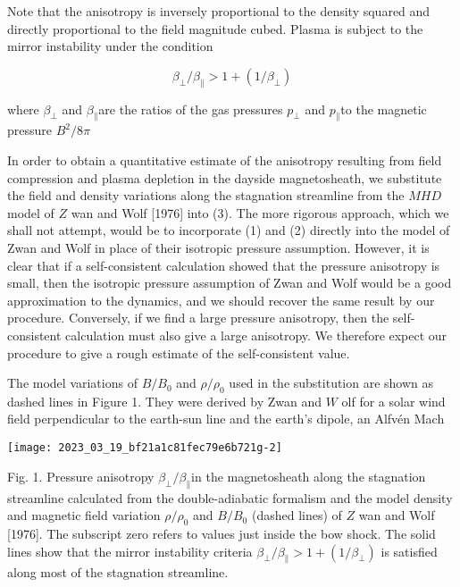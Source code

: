 \documentclass[10pt]{article}
\begin{document}
Note that the anisotropy is inversely proportional to the density squared and directly proportional to the field magnitude cubed. Plasma is subject to the mirror instability under the condition

$$
\beta_{\perp} / \beta_{\parallel}>1+\left(1 / \beta_{\perp}\right)
$$

where $\beta_{\perp}$ and $\beta_{\parallel}$are the ratios of the gas pressures $p_{\perp}$ and $p_{\parallel}$to the magnetic pressure $B^{2} / 8 \pi$

In order to obtain a quantitative estimate of the anisotropy resulting from field compression and plasma depletion in the dayside magnetosheath, we substitute the field and density variations along the stagnation streamline from the $M H D$ model of $Z$ wan and Wolf [1976] into (3). The more rigorous approach, which we shall not attempt, would be to incorporate (1) and (2) directly into the model of Zwan and Wolf in place of their isotropic pressure assumption. However, it is clear that if a self-consistent calculation showed that the pressure anisotropy is small, then the isotropic pressure assumption of Zwan and Wolf would be a good approximation to the dynamics, and we should recover the same result by our procedure. Conversely, if we find a large pressure anisotropy, then the self-consistent calculation must also give a large anisotropy. We therefore expect our procedure to give a rough estimate of the self-consistent value.

The model variations of $B / B_{0}$ and $\rho / \rho_{0}$ used in the substitution are shown as dashed lines in Figure 1. They were derived by Zwan and $W$ olf for a solar wind field perpendicular to the earth-sun line and the earth's dipole, an Alfvén Mach

\begin{center}
\texttt{[image: 2023\_03\_19\_bf21a1c81fec79e6b721g-2]}
\end{center}

Fig. 1. Pressure anisotropy $\beta_{\perp} / \beta_{\parallel}$in the magnetosheath along the stagnation streamline calculated from the double-adiabatic formalism and the model density and magnetic field variation $\rho / \rho_{0}$ and $B / B_{0}$ (dashed lines) of $Z$ wan and Wolf [1976]. The subscript zero refers to values just inside the bow shock. The solid lines show that the mirror instability criteria $\beta_{\perp} / \beta_{\parallel}>1+\left(1 / \beta_{\perp}\right)$ is satisfied along most of the stagnation streamline.
\end{document}
